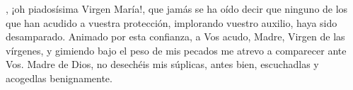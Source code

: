, ¡oh piadosísima Virgen María!, que jamás se ha oído decir que ninguno de los que han acudido a vuestra protección, 
implorando vuestro auxilio, haya sido desamparado. Animado por esta confianza, a Vos acudo, Madre, Virgen de las vírgenes, y gimiendo 
bajo el peso de mis pecados me atrevo a comparecer ante Vos. Madre de Dios, no desechéis mis súplicas, antes bien, escuchadlas y 
acogedlas benignamente.